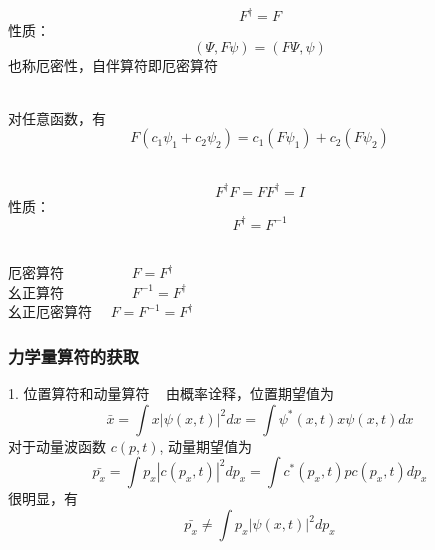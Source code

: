 \begin{frame} 
    \begin{definition}[自伴算符] 
        $$ F^{\dagger} = F $$
        性质：
        $$ (\Psi,F\psi)=(F\Psi,\psi)$$ 
        也称厄密性，{\color{red}自伴算符即厄密算符}
    \end{definition} 
    \begin{definition}[线性算符]
    ~~\\
    对任意函数，有\\
        $$F(c_1\psi_1+c_2\psi_2 ) = c_1(F\psi_1)+c_2(F\psi_2 )$$
    \end{definition}
\end{frame} 

\begin{frame}
    \begin{definition}[幺正(酉)算符] 
        $$ F^{\dagger}F = FF^{\dagger}=I $$
        性质：
        $$ F^{\dagger}=F^{-1}$$ 
    \end{definition}     
    \Tips ~\\   
    厄密算符~~~~~~~~~ $ F=F^{\dagger}$  \\
    幺正算符~~~~~~~~~ $ F^{-1}=F^{\dagger}$  \\
    幺正厄密算符~~ $ F=F^{-1}=F^{\dagger}$  \\
\end{frame} 

\begin{frame} 
    \frametitle{力学量算符的获取}
    1. 位置算符和动量算符
    \解~ 由概率诠释，位置期望值为
    \begin{equation*}
        \bar{x}=\int x|\psi(x, t)|^{2} d x=\int \psi^{*}(x, t) x \psi(x, t) d x
    \end{equation*}
    对于动量波函数 $c(p,t)$, 动量期望值为
    \begin{equation*}
        \bar{p_x}=\int p_x|c(p_x, t)|^{2} d p_x=\int c^{*}(p_x, t) p c(p_x, t) d p_x
    \end{equation*}
    很明显，有
    \begin{equation*}
        \bar{p_x}\neq\int p_x|\psi(x, t)|^{2} d p_x
    \end{equation*}
\end{frame} 


